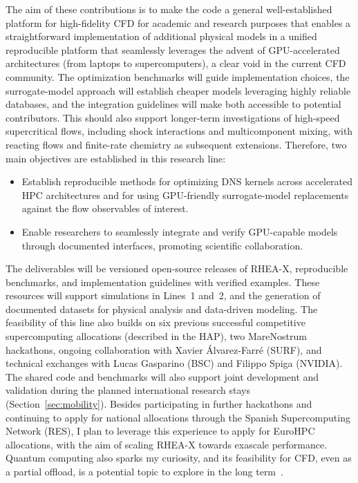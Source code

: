 \documentclass[11pt]{article}
\begin{document}
The aim of these contributions is to make the code a general well-established platform for high-fidelity CFD for academic and research purposes that enables a straightforward implementation of additional physical models in a unified reproducible platform that seamlessly leverages the advent of GPU-accelerated architectures (from laptops to supercomputers), a clear void in the current CFD community. 
The optimization benchmarks will guide implementation choices, the surrogate-model approach will establish  cheaper models leveraging highly reliable databases, and the integration guidelines will make both accessible to potential contributors. 
This should also support longer-term investigations of high-speed supercritical flows, including shock interactions and multicomponent mixing, with reacting flows and finite-rate chemistry as subsequent extensions.
Therefore, two main objectives are established in this research line:
\begin{itemize}
	\item[\textbf{O7.}] Establish reproducible methods for optimizing DNS kernels across accelerated HPC architectures and for using GPU-friendly surrogate-model replacements against the flow observables of interest.
	\item[\textbf{O8.}] Enable researchers to seamlessly integrate and verify GPU-capable models through documented interfaces, promoting scientific collaboration.
\end{itemize}

The deliverables will be versioned open-source releases of RHEA-X, reproducible benchmarks, and implementation guidelines with verified examples. 
These resources will support simulations in Lines~1 and~2, and the generation of documented datasets for physical analysis and data-driven modeling. 
The feasibility of this line also builds on six previous successful competitive supercomputing allocations (described in the HAP), two MareNostrum hackathons, ongoing collaboration with Xavier Álvarez-Farré (SURF), and technical exchanges with Lucas Gasparino (BSC) and Filippo Spiga (NVIDIA). 
The shared code and benchmarks will also support joint development and validation during the planned international research stays (Section~\ref{sec:mobility}).
Besides participating in further hackathons and continuing to apply for national allocations through the Spanish Supercomputing Network (RES), I plan to leverage this experience to apply for EuroHPC allocations, with the aim of scaling RHEA-X towards exascale performance.
Quantum computing also sparks my curiosity, and its feasibility for CFD, even as a partial offload, is a potential topic to explore in the long term~\cite{Bharadwaj2023}.
\end{document}
